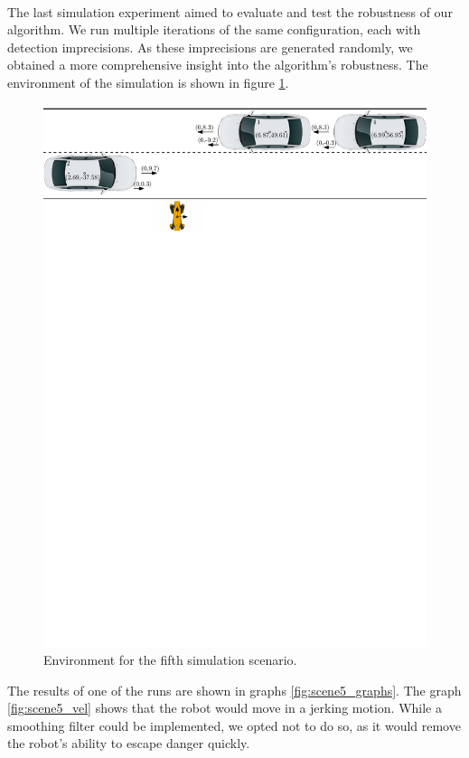         \\
            The last simulation experiment aimed to evaluate and test the robustness of our algorithm. We run multiple iterations of the same configuration, each with detection imprecisions. As these imprecisions are generated randomly, we obtained a more comprehensive insight into the algorithm's robustness. The environment of the simulation is shown in figure \ref{fig:scene5}.\\
            \begin{figure}[H]
                \centering
                \includegraphics[width=0.95\linewidth]{images/simulations/scene5.pdf}
                \caption{Environment for the fifth simulation scenario.}
                \label{fig:scene5}
            \end{figure}
            The results of one of the runs are shown in graphs \ref{fig:scene5_graphs}. The graph \ref{fig:scene5_vel} shows that the robot would move in a jerking motion. While a smoothing filter could be implemented, we opted not to do so, as it would remove the robot's ability to escape danger quickly.\\
